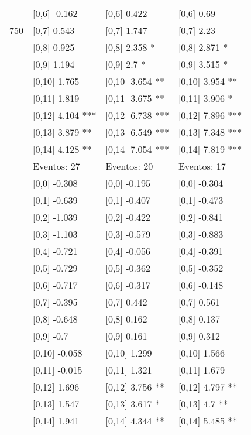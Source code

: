 \begin{table}
\begin{tabular}[t]{llll}
 & {}[0,6] -0.162 & {}[0,6] 0.422 & {}[0,6] 0.69\\
750 & {}[0,7] 0.543 & {}[0,7] 1.747 & {}[0,7] 2.23\\
\addlinespace
 & {}[0,8] 0.925 & {}[0,8] 2.358 * & {}[0,8] 2.871 *\\
 & {}[0,9] 1.194 & {}[0,9] 2.7 * & {}[0,9] 3.515 *\\
 & {}[0,10] 1.765 & {}[0,10] 3.654 ** & {}[0,10] 3.954 **\\
 & {}[0,11] 1.819 & {}[0,11] 3.675 ** & {}[0,11] 3.906 *\\
 & {}[0,12] 4.104 *** & {}[0,12] 6.738 *** & {}[0,12] 7.896 ***\\
\addlinespace
 & {}[0,13] 3.879 ** & {}[0,13] 6.549 *** & {}[0,13] 7.348 ***\\
 & {}[0,14] 4.128 ** & {}[0,14] 7.054 *** & {}[0,14] 7.819 ***\\
 & Eventos:  27 & Eventos:  20 & Eventos:  17\\
 & {}[0,0] -0.308 & {}[0,0] -0.195 & {}[0,0] -0.304\\
 & {}[0,1] -0.639 & {}[0,1] -0.407 & {}[0,1] -0.473\\
\addlinespace
 & {}[0,2] -1.039 & {}[0,2] -0.422 & {}[0,2] -0.841\\
 & {}[0,3] -1.103 & {}[0,3] -0.579 & {}[0,3] -0.883\\
 & {}[0,4] -0.721 & {}[0,4] -0.056 & {}[0,4] -0.391\\
 & {}[0,5] -0.729 & {}[0,5] -0.362 & {}[0,5] -0.352\\
 & {}[0,6] -0.717 & {}[0,6] -0.317 & {}[0,6] -0.148\\
\addlinespace
1000 & {}[0,7] -0.395 & {}[0,7] 0.442 & {}[0,7] 0.561\\
 & {}[0,8] -0.648 & {}[0,8] 0.162 & {}[0,8] 0.137\\
 & {}[0,9] -0.7 & {}[0,9] 0.161 & {}[0,9] 0.312\\
 & {}[0,10] -0.058 & {}[0,10] 1.299 & {}[0,10] 1.566\\
 & {}[0,11] -0.015 & {}[0,11] 1.321 & {}[0,11] 1.679\\
\addlinespace
 & {}[0,12] 1.696 & {}[0,12] 3.756 ** & {}[0,12] 4.797 **\\
 & {}[0,13] 1.547 & {}[0,13] 3.617 * & {}[0,13] 4.7 **\\
 & {}[0,14] 1.941 & {}[0,14] 4.344 ** & {}[0,14] 5.485 **\\
\bottomrule
\end{tabular}
\end{table}
